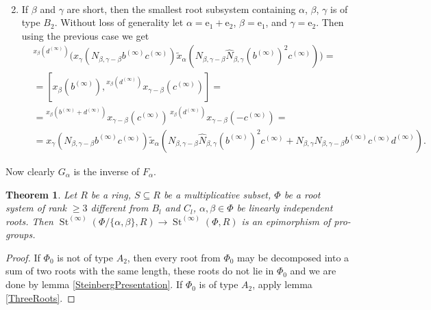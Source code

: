 \documentclass{article}
\numberwithin{equation}{section}
\newtheorem{theorem}{Theorem}
\theoremstyle{definition}
\theoremstyle{remark}
\DeclareMathOperator\St{St}
\newcommand{\up}[2]{{^{#1}\!{#2}}}
\begin{document}
\begin{enumerate}
\begin{align*}
 \end{align*}
 \item If \(\beta\) and \(\gamma\) are short, then the smallest root subsystem containing \(\alpha\), \(\beta\), \(\gamma\) is of type \(B_2\). Without loss of generality let \(\alpha = \mathrm e_1 + \mathrm e_2\), \(\beta = \mathrm e_1\), and \(\gamma = \mathrm e_2\). Then using the previous case we get
 \begin{align*}
  &\up{x_\beta(d^{(\infty)})}
   {\bigl(x_\gamma(N_{\beta, \gamma - \beta} b^{(\infty)} c^{(\infty)})
   \widetilde x_\alpha(N_{\beta, \gamma - \beta} \widehat N_{\beta, \gamma}
   (b^{(\infty)})^2 c^{(\infty)})\bigr)} =\\
  &= [x_\beta(b^{(\infty)}),
  \up{x_\beta(d^{(\infty)})}
   {x_{\gamma - \beta}(c^{(\infty)})}] =\\
  &= \up{x_\beta(b^{(\infty)} + d^{(\infty)})}
   {x_{\gamma - \beta}(c^{(\infty)})}\,
  \up{x_\beta(d^{(\infty)})}
   {x_{\gamma - \beta}(-c^{(\infty)})} =\\
  &= x_\gamma(N_{\beta, \gamma - \beta} b^{(\infty)} c^{(\infty)})
  \widetilde x_\alpha(N_{\beta, \gamma - \beta} \widehat N_{\beta, \gamma}
   (b^{(\infty)})^2 c^{(\infty)}
   + N_{\beta, \gamma} N_{\beta, \gamma - \beta}
   b^{(\infty)} c^{(\infty)} d^{(\infty)}).
 \end{align*}
 \end{enumerate}

 Now clearly \(G_\alpha\) is the inverse of \(F_\alpha\).


 \begin{theorem}\label{DoubleRootElimination}
  Let \(R\) be a ring, \(S \subseteq R\) be a multiplicative subset, \(\Phi\) be a root system of rank \(\geq 3\) different from \(B_l\) and \(C_l\), \(\alpha, \beta \in \Phi\) be linearly independent roots. Then \(\St^{(\infty)}(\Phi / \{\alpha, \beta\}, R) \to \St^{(\infty)}(\Phi, R)\) is an epimorphism of pro-groups.
 \end{theorem}
 \begin{proof}
  If \(\Phi_0\) is not of type \(A_2\), then every root from \(\Phi_0\) may be decomposed into a sum of two roots with the same length, these roots do not lie in \(\Phi_0\) and we are done by lemma \ref{SteinbergPresentation}. If \(\Phi_0\) is of type \(A_2\), apply lemma \ref{ThreeRoots}.
 \end{proof}



\printbibliography
\end{document}
